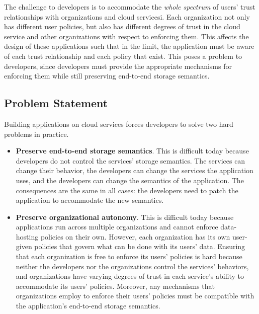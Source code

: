 The challenge to developers is to accommodate the \emph{whole spectrum} of
users' trust relationships with organizations and cloud servicesi.
Each organization not only has different user
policies, but also has different degrees of trust in the cloud service and other
organizations with respect to enforcing them.
This affects the design of these applications such that in the limit,
the application must be aware of each trust relationship and each policy that
exist.  This poses a problem to developers, since developers 
must provide the appropriate mechanisms for enforcing them while still
preserving end-to-end storage semantics.

\subsection{Problem Statement}

Building applications on cloud services forces developers to solve two hard
problems in practice.

\begin{itemize}
   \item \textbf{Preserve end-to-end storage semantics}.  This is difficult
      today because developers do not
      control the services' storage semantics.  The services can change their
      behavior, the developers can change the services the application uses, and
      the developers can change the semantics of the application.
      The consequences are the same in all cases:  the developers need to patch the application to
      accommodate the new semantics.

   \item \textbf{Preserve organizational autonomy}.  This is difficult today
      because applications run across multiple organizations and cannot enforce
      data-hosting policies on their own.  However, each organization has its
      own user-given policies that govern what can be done with its users' data.
      Ensuring that each organization is free to enforce its users' policies is
      hard because neither the developers nor the organizations
      control the services' behaviors, and organizations have varying degrees of trust in
      each service's ability to accommodate its users' policies.  Moreover, any mechanisms
      that organizations employ to enforce their users' policies must be
      compatible with the application's end-to-end storage semantics.
\end{itemize}

